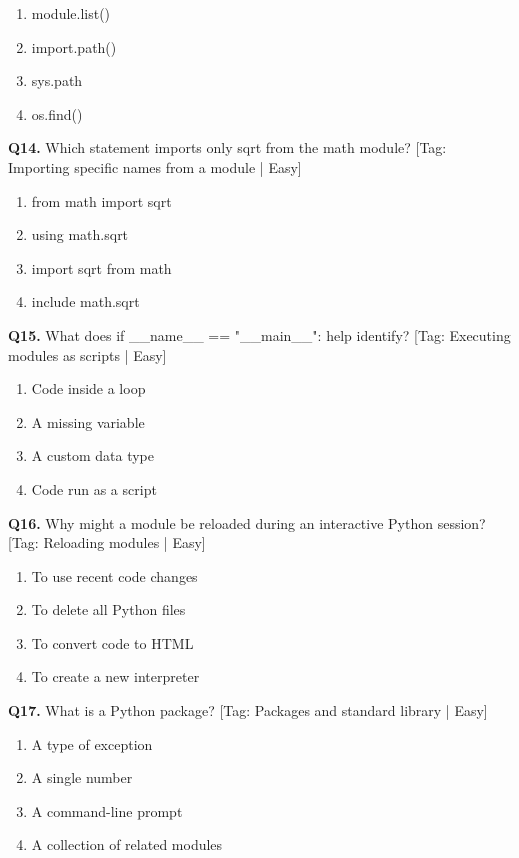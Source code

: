 \begin{enumerate}[label=(\alph*),topsep=2pt,itemsep=1pt,partopsep=0pt,parsep=0pt]
    \item {module.list()}
    \item {import.path()}
    \item {sys.path}
    \item {os.find()}
\end{enumerate}
\vspace{2mm}
\noindent\textbf{Q14.} Which statement imports only sqrt from the math module? \hfill [Tag: Importing specific names from a module | Easy]
\begin{enumerate}[label=(\alph*),topsep=2pt,itemsep=1pt,partopsep=0pt,parsep=0pt]
    \item {from math import sqrt}
    \item {using math.sqrt}
    \item {import sqrt from math}
    \item {include math.sqrt}
\end{enumerate}
\vspace{2mm}
\noindent\textbf{Q15.} What does if \_\_name\_\_ == "\_\_main\_\_": help identify? \hfill [Tag: Executing modules as scripts | Easy]
\begin{enumerate}[label=(\alph*),topsep=2pt,itemsep=1pt,partopsep=0pt,parsep=0pt]
    \item {Code inside a loop}
    \item {A missing variable}
    \item {A custom data type}
    \item {Code run as a script}
\end{enumerate}
\vspace{2mm}
\noindent\textbf{Q16.} Why might a module be reloaded during an interactive Python session? \hfill [Tag: Reloading modules | Easy]
\begin{enumerate}[label=(\alph*),topsep=2pt,itemsep=1pt,partopsep=0pt,parsep=0pt]
    \item {To use recent code changes}
    \item {To delete all Python files}
    \item {To convert code to HTML}
    \item {To create a new interpreter}
\end{enumerate}
\vspace{2mm}
\noindent\textbf{Q17.} What is a Python package? \hfill [Tag: Packages and standard library | Easy]
\begin{enumerate}[label=(\alph*),topsep=2pt,itemsep=1pt,partopsep=0pt,parsep=0pt]
    \item {A type of exception}
    \item {A single number}
    \item {A command-line prompt}
    \item {A collection of related modules}
\end{enumerate}
